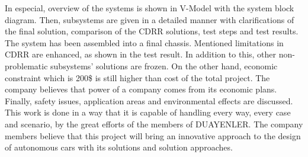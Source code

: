 \documentclass[a4paper,12pt]{article}
\begin{document}
		In especial, overview of the systems is shown in V-Model with the system block diagram. Then, subsystems are given in a detailed manner with clarifications of the final solution, comparison of the CDRR solutions, test steps and test results. The system has been assembled into a final chassis. Mentioned limitations in CDRR are enhanced, as shown in the test result. In addition to this, other non-problematic subsystems’ solutions are frozen. On the other hand, economic constraint which is 200\$ is still higher than cost of the total project. The company believes that power of a company comes from its economic plans. Finally, safety issues, application areas and environmental effects are discussed. \\
		
		This work is  done in a way that it is capable of handling every way, every case and scenario, by the great efforts of the members of DUAYENLER. The company members believe that this project will bring an innovative approach to the design of autonomous cars with its solutions and solution approaches. 

\newpage



\begin{appendices}












\end{appendices}
\end{document}
